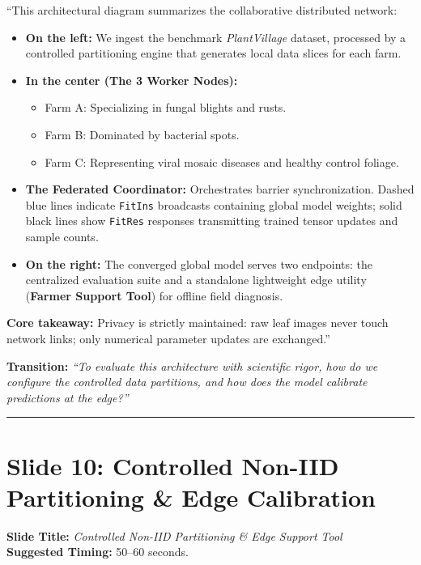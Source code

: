\documentclass[11pt,a4paper]{article}
\begin{document}
\begin{tcolorbox}[colframe=darkgreen, title=\textbf{What to Say in the Presentation (Literal Script)}]
``This architectural diagram summarizes the collaborative distributed network:

\begin{itemize}
    \item \textbf{On the left:} We ingest the benchmark \textit{PlantVillage} dataset, processed by a controlled partitioning engine that generates local data slices for each farm.
    \item \textbf{In the center (The 3 Worker Nodes):}
    \begin{itemize}
        \item Farm A: Specializing in fungal blights and rusts.
        \item Farm B: Dominated by bacterial spots.
        \item Farm C: Representing viral mosaic diseases and healthy control foliage.
    \end{itemize}
    \item \textbf{The Federated Coordinator:} Orchestrates barrier synchronization. Dashed blue lines indicate \texttt{FitIns} broadcasts containing global model weights; solid black lines show \texttt{FitRes} responses transmitting trained tensor updates and sample counts.
    \item \textbf{On the right:} The converged global model serves two endpoints: the centralized evaluation suite and a standalone lightweight edge utility (\textbf{Farmer Support Tool}) for offline field diagnosis.
\end{itemize}
\textbf{Core takeaway:} Privacy is strictly maintained: raw leaf images never touch network links; only numerical parameter updates are exchanged.''
\end{tcolorbox}

\textbf{Transition:} \textit{``To evaluate this architecture with scientific rigor, how do we configure the controlled data partitions, and how does the model calibrate predictions at the edge?''}

\vspace{0.35cm}\hrule\vspace{0.35cm}

\section{Slide 10: Controlled Non-IID Partitioning \& Edge Calibration}
\textbf{Slide Title:} \textit{Controlled Non-IID Partitioning \& Edge Support Tool} \\
\textbf{Suggested Timing:} 50--60 seconds.
\end{document}
